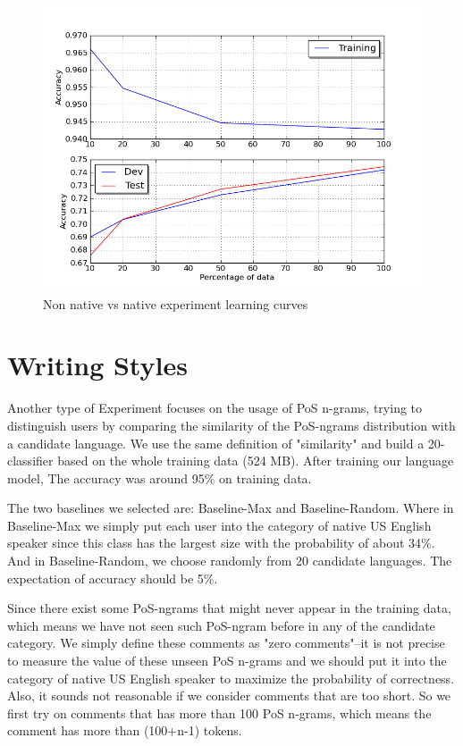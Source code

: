 \documentclass[11pt]{article}
\begin{document}
\begin{figure}[htp]
\centering
\includegraphics[scale=0.45]{native_lc.png}
\caption{Non native vs native experiment learning curves}
\label{non_lc}
\end{figure}

\section{Writing Styles}
Another type of Experiment focuses on the usage of PoS n-grams, trying to distinguish users by comparing the similarity of the PoS-ngrams distribution with a candidate language. We use the same definition of "similarity" and build a 20-classifier based on the whole training data (524 MB). After training our language model, The accuracy was around 95\% on training data.

The two baselines we selected are: Baseline-Max and Baseline-Random. Where in Baseline-Max we simply put each user into the category of native US English speaker since this class has the largest size with the
probability of about 34\%. And in Baseline-Random, we choose randomly from 20 candidate languages. The expectation of accuracy should be 5\%.

Since there exist some PoS-ngrams that might never appear in the training data, which means we have not seen such PoS-ngram before in any of the candidate category. We simply define these comments as "zero comments"--it is not precise to measure the value of these unseen PoS n-grams and we should put it into the category of native US English speaker to maximize the probability of correctness. Also, it sounds not reasonable if we consider comments that are too short. So we first try on comments that has more than 100 PoS n-grams, which means the comment has more than (100+n-1) tokens.
\end{document}
